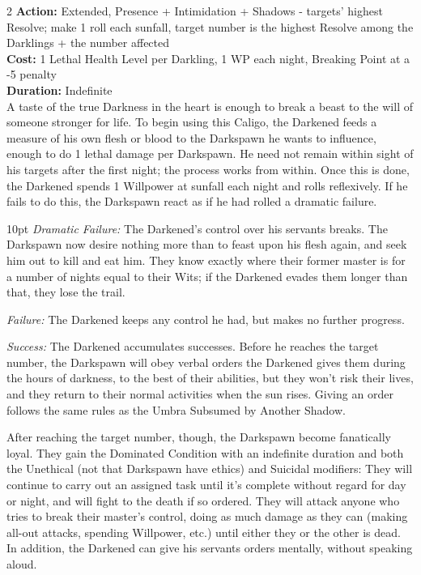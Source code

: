 \begin{multicols}{2}
\noindent \textbf{Action:} Extended, Presence + Intimidation + Shadows - targets' highest Resolve; make 1 roll each sunfall, target number is the highest Resolve among the Darklings + the number affected\\

\noindent \textbf{Cost:} 1 Lethal Health Level per Darkling, 1 WP each night, Breaking Point at a -5 penalty\\

\noindent \textbf{Duration:} Indefinite \\

\noindent A taste of the true Darkness in the heart is enough to break a beast to the will of someone stronger for life. To begin using this Caligo, the Darkened feeds a measure of his own flesh or blood to the Darkspawn he wants to influence, enough to do 1 lethal damage per Darkspawn. He need not remain within sight of his targets after the first night; the process works from within. Once this is done, the Darkened spends 1 Willpower at sunfall each night and rolls reflexively. If he fails to do this, the Darkspawn react as if he had rolled a dramatic failure.

\begin{myindentpar}{10pt}    \emph{Dramatic Failure:} The Darkened's control over his servants breaks. The Darkspawn now desire nothing more than to feast upon his flesh again, and seek him out to kill and eat him. They know exactly where their former master is for a number of nights equal to their Wits; if the Darkened evades them longer than that, they lose the trail.

    \emph{Failure:} The Darkened keeps any control he had, but makes no further progress.

    \emph{Success:} The Darkened accumulates successes. Before he reaches the target number, the Darkspawn will obey verbal orders the Darkened gives them during the hours of darkness, to the best of their abilities, but they won't risk their lives, and they return to their normal activities when the sun rises. Giving an order follows the same rules as the Umbra Subsumed by Another Shadow.

    After reaching the target number, though, the Darkspawn become fanatically loyal. They gain the Dominated Condition with an indefinite duration and both the Unethical (not that Darkspawn have ethics) and Suicidal modifiers: They will continue to carry out an assigned task until it's complete without regard for day or night, and will fight to the death if so ordered. They will attack anyone who tries to break their master's control, doing as much damage as they can (making all-out attacks, spending Willpower, etc.) until either they or the other is dead. In addition, the Darkened can give his servants orders mentally, without speaking aloud.


\end{myindentpar}
\end{multicols}
